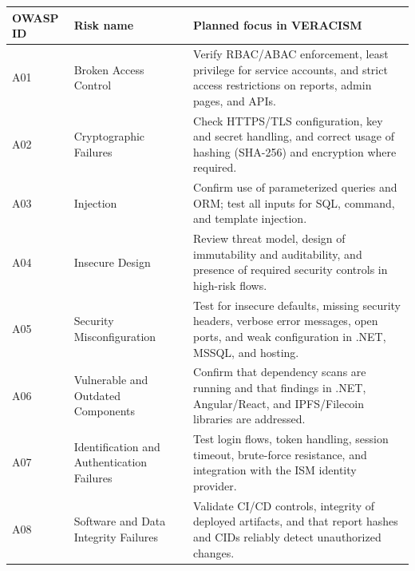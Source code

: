 \begin{table}[htbp]
  \centering
  \smalltable
  \footnotesize
  {%
  \setlength{\tabcolsep}{6pt}
  \renewcommand{\arraystretch}{1.3}
  \begin{tabular}{|>{\raggedright\arraybackslash}p{1.5cm}|
                  >{\raggedright\arraybackslash}p{4.0cm}|
                  >{\raggedright\arraybackslash}p{6.9cm}|}
    \hline
    \textbf{OWASP ID} &
    \textbf{Risk name} &
    \textbf{Planned focus in VERACISM} \\
    \hline\hline

    A01 &
    Broken Access Control &
    Verify RBAC/ABAC enforcement, least privilege for service accounts, and
    strict access restrictions on reports, admin pages, and APIs. \\
    \hline

    A02 &
    Cryptographic Failures &
    Check HTTPS/TLS configuration, key and secret handling, and correct usage
    of hashing (SHA-256) and encryption where required. \\
    \hline

    A03 &
    Injection &
    Confirm use of parameterized queries and ORM; test all inputs for SQL,
    command, and template injection. \\
    \hline

    A04 &
    Insecure Design &
    Review threat model, design of immutability and auditability, and presence
    of required security controls in high-risk flows. \\
    \hline

    A05 &
    Security Misconfiguration &
    Test for insecure defaults, missing security headers, verbose error messages,
    open ports, and weak configuration in .NET, MSSQL, and hosting. \\
    \hline

    A06 &
    Vulnerable and Outdated Components &
    Confirm that dependency scans are running and that findings in .NET,
    Angular/React, and IPFS/Filecoin libraries are addressed. \\
    \hline

    A07 &
    Identification and Authentication Failures &
    Test login flows, token handling, session timeout, brute-force resistance,
    and integration with the ISM identity provider. \\
    \hline

    A08 &
    Software and Data Integrity Failures &
    Validate CI/CD controls, integrity of deployed artifacts, and that report
    hashes and CIDs reliably detect unauthorized changes. \\
    \hline


\end{tabular}}
\end{table}
